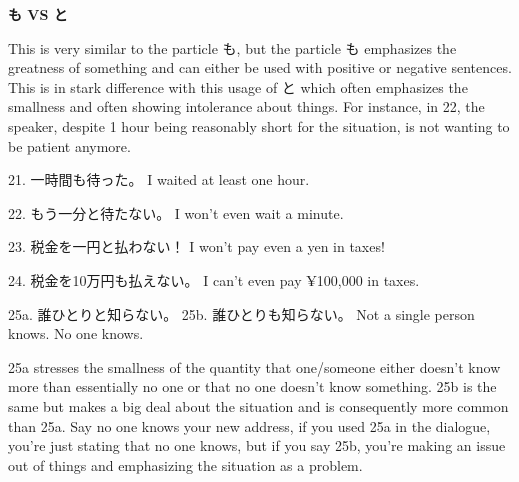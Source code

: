 \begin{center}
 \textbf{も VS と }
\end{center}

\par{ This is very similar to the particle も, but the particle も emphasizes the greatness of something and can either be used with positive or negative sentences. This is in stark difference with this usage of と which often emphasizes the smallness and often showing intolerance about things. For instance, in 22, the speaker, despite 1 hour being reasonably short for the situation, is not wanting to be patient anymore. }

\par{21. 一時間も待った。 \hfill\break
I waited at least one hour. }

\par{22. もう一分と待たない。 \hfill\break
I won't even wait a minute. }

\par{23. 税金を一円と払わない！ \hfill\break
I won't pay even a yen in taxes! }

\par{24. 税金を10万円も払えない。 \hfill\break
I can't even pay ¥100,000 in taxes. }

\par{25a. 誰ひとりと知らない。 \hfill\break
25b. 誰ひとりも知らない。 \hfill\break
Not a single person knows. \hfill\break
No one knows. }

\par{ 25a stresses the smallness of the quantity that one\slash someone either doesn't know more than essentially no one or that no one doesn't know something. 25b is the same but makes a big deal about the situation and is consequently more common than 25a. Say no one knows your new address, if you used 25a in the dialogue, you're just stating that no one knows, but if you say 25b, you're making an issue out of things and emphasizing the situation as a problem. }
    